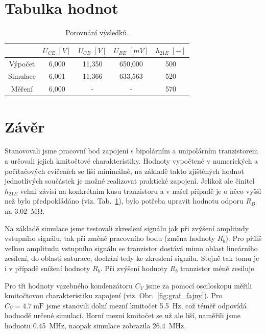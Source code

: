 \documentclass{protokol}
\begin{document}
\clearpage
\section{Tabulka hodnot}
\begin{table}[h!]
	\centering
	\def\arraystretch{1.4}
	\centering
	\begin{tabular}{|c|c|c|c|c|}	
		\hline
		& $U_{CE} \; [V]$ & $U_{CB} \; [V]$ & $U_{BE}\; [mV]$ & $h_{21E} \; [-]$ \\ [0.1ex]
		\hline
		Výpočet   &6,000  &11,350 &650,000&500\\ [0.1ex]
		\hline 
		Simulace  &6,001 &11,366 &633,563&520  \\[0.1ex]
		\hline
		Měření    &6,000 & - & - &570\\[0.1ex]
		\hline
	\end{tabular}
		\caption{Porovnání výsledků.}
		\label{tab:porovnani}
\end{table}


\section{Závěr}
	Stanovovali jsme pracovní bod zapojení s bipolárním a unipolárním tranzistorem a určovali jejich kmitočtové charakteristiky. Hodnoty vypočtené v numerických a počítačových cvičeních se liší minimálně, na základě takto zjištěných hodnot jednotlivých součástek je možné realizovat praktické zapojení. Jelikož ale činitel $ h_{21E} $ velmi závisí na konkrétním kusu tranzistoru a v našel případě je o něco vyšší než bylo předpokládáno (viz. Tab.~\ref{tab:porovnani}), bylo potřeba upravit hodnotu odporu $ R_B $ na \SI{3,02}{\mega\ohm}.
	
	Na základě simulace jsme testovali zkreslení signálu jak při zvýšení amplitudy vstupního signálu, tak při změně pracovního bodu (změna hodnoty $ R_b $). Pro příliš velkou amplitudu vstupního signálu se tranzistor dostává mimo oblast lineárního zesílení, do oblasti saturace, dochází tedy ke zkreslení signálu. Stejně tak tomu je i v případě snížení hodnoty $ R_b $. Při zvýšení hodnoty $ R_b $ tranzistor méně zesiluje.
	
	Pro tři hodnoty vazebného kondenzátoru $ C_V $ jsme za pomocí osciloskopu měřili kmitočtovou charakteristiku zapojení (viz. Obr.~\ref{fig:graf_fajny}). Pro $ C_V=\SI{4.7}{\milli\farad} $ jsme stanovili dolní mezní kmitočet \SI{5.5}{\hertz}, což téměř odpovídá hodnodě určené simulací. Horní mezní kmitočet se už ale liší, naměřili jsme hodnotu \SI{0.45}{\mega\hertz}, naopak simulace zobrazila \SI{26.4}{\mega\hertz}.
\end{document}
